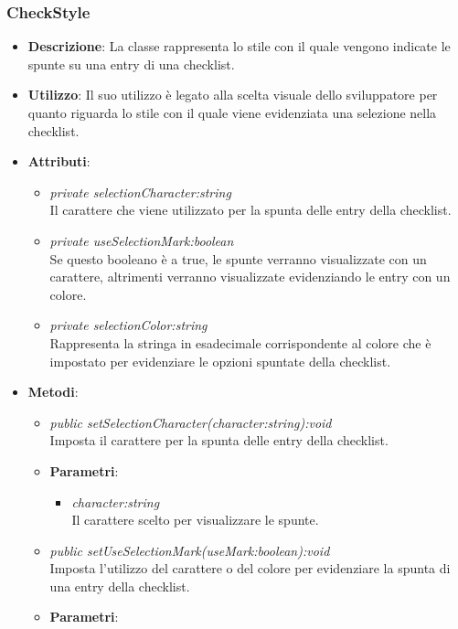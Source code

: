 \subsubsection{CheckStyle}
\begin{itemize}
\item \textbf{Descrizione}: La classe rappresenta lo stile con il quale vengono indicate le spunte su una entry di una checklist.
\item \textbf{Utilizzo}: Il suo utilizzo è legato alla scelta visuale dello sviluppatore per quanto riguarda lo stile con il quale viene evidenziata una selezione nella checklist.
\item \textbf{Attributi}:
	\begin{itemize}
	\item \textit{private selectionCharacter:string}\\
	Il carattere che viene utilizzato per la spunta delle entry della checklist.
	\item \textit{private useSelectionMark:boolean}\\
	Se questo booleano è a true, le spunte verranno visualizzate con un carattere, altrimenti verranno visualizzate evidenziando le entry con un colore.
	\item \textit{private selectionColor:string}\\
	Rappresenta la stringa in esadecimale corrispondente al colore che è impostato per evidenziare le opzioni spuntate della checklist.
	\end{itemize}
\item \textbf{Metodi}:
	\begin{itemize}
	\item \textit{public setSelectionCharacter(character:string):void}\\
	Imposta il carattere per la spunta delle entry della checklist.
		\item{\textbf{Parametri}: \begin{itemize}
		\item \textit{character:string}\\
		Il carattere scelto per visualizzare le spunte.
		\end{itemize}}
	\item \textit{public setUseSelectionMark(useMark:boolean):void}\\
	Imposta l'utilizzo del carattere o del colore per evidenziare la spunta di una entry della checklist.
		\item{\textbf{Parametri}: \begin{itemize}

\end{itemize}}
\end{itemize}
\end{itemize}
